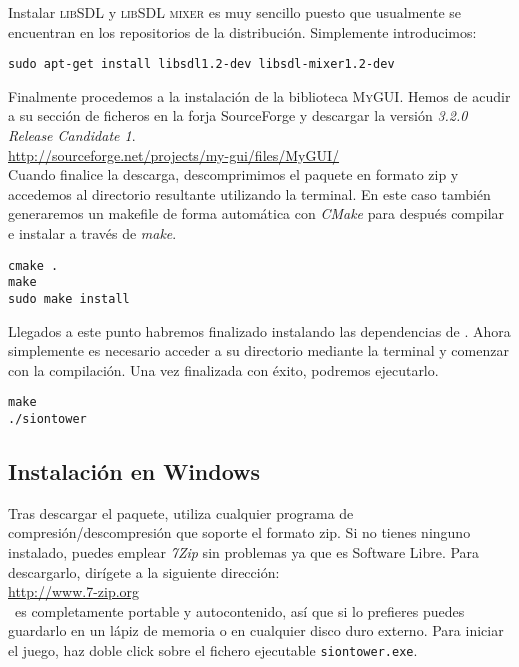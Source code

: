 Instalar \textsc{libSDL} y \textsc{libSDL mixer} es muy sencillo puesto
que usualmente se encuentran en los repositorios de la distribución. Simplemente
introducimos:

\begin{lstlisting}[style=consola]
sudo apt-get install libsdl1.2-dev libsdl-mixer1.2-dev
\end{lstlisting}

Finalmente procedemos a la instalación de la biblioteca \textsc{MyGUI}.
Hemos de acudir a su sección de ficheros en la forja SourceForge y descargar
la versión \textit{3.2.0 Release Candidate 1}.\\

\url{http://sourceforge.net/projects/my-gui/files/MyGUI/}\\

Cuando finalice la descarga, descomprimimos el paquete en formato zip y
accedemos al directorio resultante utilizando la terminal. En este caso
también generaremos un makefile de forma automática con \textit{CMake}
para después compilar e instalar a través de \textit{make}.

\begin{lstlisting}[style=consola]
cmake .
make
sudo make install
\end{lstlisting}

Llegados a este punto habremos finalizado instalando las dependencias de
\juego. Ahora simplemente es necesario acceder a su directorio mediante
la terminal y comenzar con la compilación. Una vez finalizada con éxito,
podremos ejecutarlo.

\begin{lstlisting}[style=consola]
make
./siontower
\end{lstlisting}



\subsection*{Instalación en Windows}

Tras descargar el paquete, utiliza cualquier programa de compresión/descompresión
que soporte el formato zip. Si no tienes ninguno instalado, puedes emplear
\textit{7Zip} sin problemas ya que es Software Libre. Para descargarlo, dirígete
a la siguiente dirección:\\

\url{http://www.7-zip.org}\\

\juego\ es completamente portable y autocontenido, así que si lo prefieres
puedes guardarlo en un lápiz de memoria o en cualquier disco duro externo.
Para iniciar el juego, haz doble click sobre el fichero ejecutable
\texttt{siontower.exe}.

